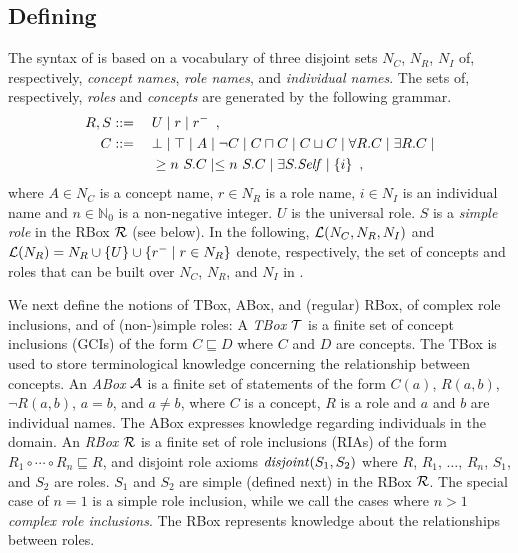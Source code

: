 \documentclass[
]{ceurart}
\begin{document}
\subsection{Defining \SROIQ}

The syntax of \SROIQ is based on a vocabulary of three disjoint sets $N_C$, $N_R$, $N_I$ of, respectively, \emph{concept names}, \emph{role names}, and \emph{individual names}. The sets of, respectively, \SROIQ  \emph{roles} and \SROIQ \emph{concepts} are generated by the following grammar.
{\footnotesize
\begin{alignat*}{2}
  R, S &::={} && U \mid r \mid r^{-} \enspace,\\
  C &::= && \bot \mid \top \mid A \mid \neg C \mid C \sqcap C \mid C \sqcup C \mid \forall R.C \mid \exists R.C \mid \\ 
  &&& \geq n~S.C \mid \leq n~S.C \mid \exists S.\mathit{Self} \mid \{i\} \enspace,
\end{alignat*}
}
\noindent where $A \in N_C$ is a concept name, $r \in N_R$ is a role name, $i \in N_I$ is an individual name and $n \in \mathbb{N}_0$ is a non-negative integer. 
%
$U$ is the universal role. $S$ is a \emph{simple role} in the RBox $\mathcal{R}$ (see below). In the following, $\mathcal{L}(N_C, N_R, N_I)$ and $\mathcal{L}(N_R) = N_R \cup \{U\} \cup \{r^- \mid r \in N_R\}$ denote, respectively, the set of concepts and roles that can be built over $N_C$, $N_R$, and $N_I$ in \SROIQ.

We next define the notions of TBox, ABox, and (regular) RBox, of complex role inclusions, and of (non-)simple roles:
A \emph{TBox} $\mathcal{T}$ is a finite set of concept inclusions (GCIs) of the form $C \sqsubseteq D$ where $C$ and $D$ are concepts. The TBox is used to store terminological knowledge concerning the relationship between concepts. 
%
An \emph{ABox} $\mathcal{A}$ is a finite set of statements of the form $C(a)$, $R(a,b)$, $\lnot R (a,b)$, $a = b$, and $a \not= b$, where $C$ is a concept, $R$ is a role and $a$ and $b$ are individual names. The ABox expresses knowledge regarding individuals in the domain. 
%
An \emph{RBox} $\mathcal{R}$ is a finite set of role inclusions (RIAs) of the form $R_1 \circ \cdots \circ R_n \sqsubseteq R$, and disjoint role axioms $\mathit{disjoint}(S_1, S_2)$ where $R$, $R_1$, $\dots$, $R_n$, $S_1$, and $S_2$ are roles. $S_1$ and $S_2$ are simple (defined next) in the RBox $\mathcal{R}$. The special case of $n = 1$ is a simple role inclusion, while we call the cases where $n > 1$ \emph{complex role inclusions}. The RBox represents knowledge about the relationships between roles.
\end{document}
